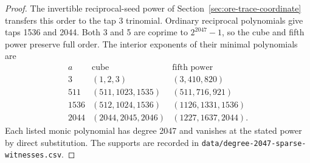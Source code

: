 \documentclass[11pt]{article}
\begin{document}
\begin{proof}
The invertible reciprocal-seed power of Section~\ref{sec:ore-trace-coordinate}
transfers this order to the tap 3 trinomial. Ordinary reciprocal
polynomials give taps 1536 and 2044. Both 3 and 5 are coprime to
\(2^{2047}-1\), so the cube and fifth power preserve full order.
The interior exponents of their minimal polynomials are
\[
\begin{array}{r|l|l}
 a&\text{cube}&\text{fifth power}\\ \hline
 3&(1,2,3)&(3,410,820)\\
 511&(511,1023,1535)&(511,716,921)\\
 1536&(512,1024,1536)&(1126,1331,1536)\\
 2044&(2044,2045,2046)&(1227,1637,2044).
\end{array}
\]
Each listed monic polynomial has degree 2047 and vanishes at the
stated power by direct substitution. The supports are recorded in
\nolinkurl{data/degree-2047-sparse-witnesses.csv}.
\end{proof}

\clearpage
\end{document}
